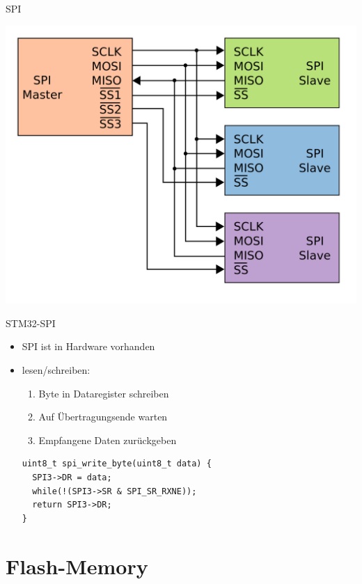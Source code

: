   \begin{frame} {SPI}
    \begin{center}
      \includegraphics[height=.8\textheight]{SPI-parallel}    
    \end{center}
  \end{frame}

  \begin{frame} [fragile] {STM32-SPI}
    \begin{itemize}
      \item SPI ist in Hardware vorhanden
      \item lesen/schreiben:
      \begin{enumerate}
        \item Byte in Dataregister schreiben
        \item Auf Übertragungsende warten
        \item Empfangene Daten zurückgeben
      \end{enumerate}
      \begin{lstlisting}
uint8_t spi_write_byte(uint8_t data) {
  SPI3->DR = data;
  while(!(SPI3->SR & SPI_SR_RXNE)); 
  return SPI3->DR;
}
        \end{lstlisting}
    \end{itemize}
  \end{frame}


  \section{Flash-Memory}


